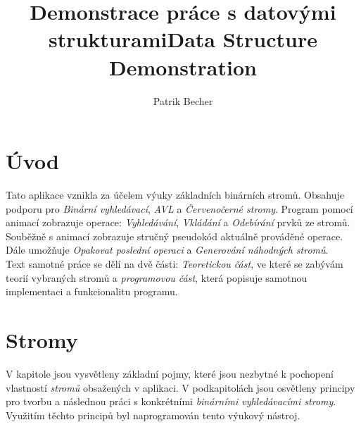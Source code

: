 \documentclass[
  biblatex=false,
  font=serif,
  glossaries=false,
  tables=false,
  theorems=false,
  index
]{kidiplom}
\title{Demonstrace práce s datovými strukturami}
\title[english]{Data Structure Demonstration}
\author{Patrik Becher}
\begin{document}


\maketitle





\section{Úvod}
\indent\indent Tato aplikace vznikla za účelem výuky základních binárních stromů. Obsahuje podporu pro \textit{Binární vyhledávací}, \textit{AVL} a \textit{Červenočerné stromy}. Program pomocí animací zobrazuje operace: \textit{Vyhledávání}, \textit{Vkládání} a \textit{Odebírání} prvků ze stromů. Souběžně s animací zobrazuje stručný pseudokód aktuálně prováděné operace. Dále umožňuje \textit{Opakovat poslední operaci} a \textit{Generování náhodných stromů}.\\
\indent Text samotné práce se dělí na dvě části: \textit{Teoretickou část}, ve které se zabývám teorií vybraných stromů a \textit{programovou část}, která popisuje samotnou implementaci a funkcionalitu programu.\\

\newpage
\section{Stromy}
\indent \indent V kapitole jsou vysvětleny základní pojmy, které jsou nezbytné k pochopení vlastností \textit{stromů} obsažených v aplikaci. V podkapitolách jsou osvětleny principy pro tvorbu a následnou práci s konkrétními \textit{binárními vyhledávacími stromy}. Využitím těchto principů byl naprogramován tento výukový nástroj.\\
\end{document}
